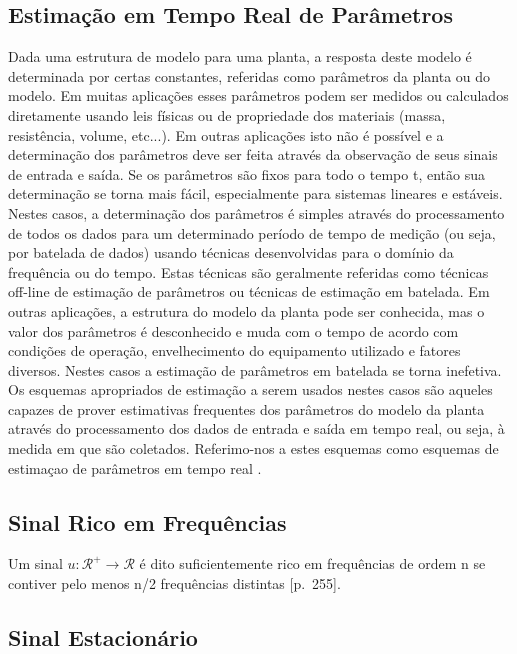 \documentclass[
	12pt,				%
	openright,			%
	twoside,			%
	a4paper,			%
	english,			%
	french,				%
	spanish,			%
	brazil				%
	]{abntex2}
\begin{document}
\subsection{Estimação em Tempo Real de Parâmetros}

 Dada uma estrutura de modelo para uma planta, a resposta deste modelo é determinada por certas constantes, referidas como parâmetros da planta ou do modelo. Em muitas aplicações esses parâmetros podem ser medidos ou calculados diretamente usando leis físicas ou de propriedade dos materiais (massa, resistência, volume, etc...). Em outras aplicações isto não é possível e a determinação dos parâmetros deve ser feita através da observação de seus sinais de entrada e saída. Se os parâmetros são fixos para todo o tempo t, então sua determinação se torna mais fácil, especialmente para sistemas lineares e estáveis. Nestes casos, a determinação dos parâmetros é simples através do processamento de todos os dados para um determinado período de tempo de medição (ou seja, por batelada de dados) usando técnicas desenvolvidas para o domínio da frequência ou do tempo. Estas técnicas são geralmente referidas como técnicas off-line de estimação de parâmetros ou técnicas de estimação em batelada. Em outras aplicações, a estrutura do modelo da planta pode ser conhecida, mas o valor dos parâmetros é desconhecido e muda com o tempo de acordo com condições de operação, envelhecimento do equipamento utilizado e fatores diversos. Nestes casos a estimação de parâmetros em batelada se torna inefetiva. \\

 Os esquemas apropriados de estimação a serem usados nestes casos são aqueles capazes de prover estimativas frequentes dos parâmetros do modelo da planta através do processamento dos dados de entrada e saída em tempo real, ou seja, à medida em que são coletados. Referimo-nos a estes esquemas como esquemas de estimaçao de parâmetros em tempo real \cite[p.~144-145]{ioannou2}.\\

\subsection{Sinal Rico em Frequências}

 Um sinal $u:\mathcal{R}^+\rightarrow \mathcal{R}$ é dito suficientemente rico em frequências de ordem n se contiver pelo menos n/2 frequências distintas [p.~255]\cite{ioannou2}.
 
\subsection{Sinal Estacionário} 
 
\end{document}
